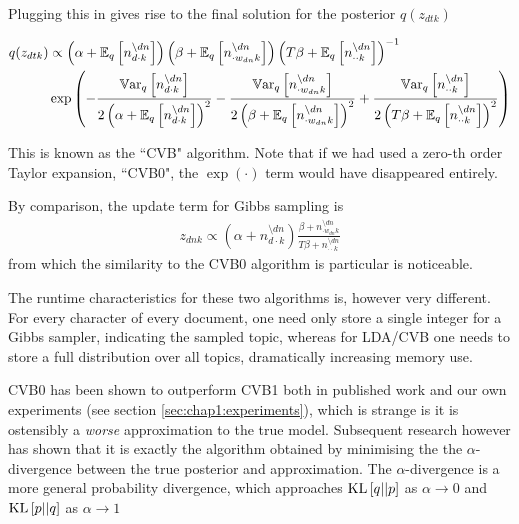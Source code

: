 Plugging this in gives rise to the final solution for the posterior $q(z_{dtk})$

{\small
\begin{align}
\begin{split}
q(z_{dtk}) & \propto
\left(\alpha + \ex{n_{d\cdot k}^{\setminus dn}}{q}\right)
\left(\beta + \ex{n_{\cdot w_{dn} k}^{\setminus dn}}{q}\right)
\invb{T \beta + \ex{n_{\cdot \cdot k}^{\setminus dn}}{q}}\\
&\exp\left(
    -\frac{
        \var{n_{d\cdot k}^{\setminus dn}}{q}
    } {
    2 \left(\alpha + \ex{n_{d\cdot k}^{\setminus dn}}{q}\right)^2
    }
    -\frac{
        \var{n_{\cdot w_{dn} k}^{\setminus dn}}{q}
    } {
    2 \left(\beta + \ex{n_{\cdot w_{dn} k}^{\setminus dn}}{q}\right)^2
    }
    +\frac{
        \var{n_{\cdot \cdot k}^{\setminus dn}}{q}
    } {
    2 \left(T \beta + \ex{n_{\cdot \cdot k}^{\setminus dn}}{q}\right)^2
    }
\right)
\end{split}\label{eqn:lda-cvb-update}
\end{align}
}


This is known as the ``CVB" algorithm. Note that if we had used a zero-th order Taylor expansion, ``CVB0", the $\exp(\cdot)$ term would have disappeared entirely.

By comparison, the update term for Gibbs sampling is 
\begin{align}
z_{dnk} \propto 
\left(\alpha + n_{d\cdot k}^{\setminus dn}\right)
\frac{
        \beta + n_{\cdot w_{dn} k}^{\setminus dn}
     } {
        T \beta + n_{\cdot \cdot k}^{\setminus dn}
    }\label{eqn:lda-gibbs-update}
\end{align}
from which the similarity to the CVB0 algorithm is particular is noticeable.

The runtime characteristics for these two algorithms is, however very different. For every character of every document, one need only store a single integer for a Gibbs sampler, indicating the sampled topic, whereas for LDA/CVB one needs to store a full distribution over all topics, dramatically increasing memory use.

CVB0 has been shown to outperform CVB1 both in published work\cite{Asuncion2012}\cite{Teh2007} and our own experiments (see section \ref{sec:chap1:experiments}), which is strange is it is ostensibly a \emph{worse} approximation to the true model. Subsequent research\cite{Sato2012} however has shown that it is exactly the algorithm obtained by minimising the the $\alpha$-divergence between the true posterior and approximation. The $\alpha$-divergence is a more general probability divergence, which approaches $\kl{q}{p}$ as $\alpha \rightarrow 0$ and $\kl{p}{q}$ as $\alpha \rightarrow 1$

